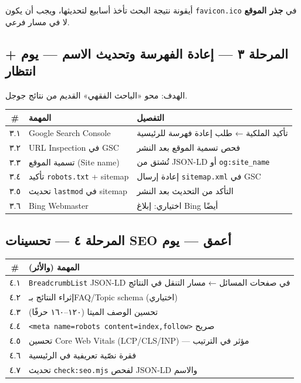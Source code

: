 \documentclass[11pt]{article}
\newcommand{\code}[1]{\textcolor{darkbg}{\texttt{\small #1}}}
\begin{document}
\begin{riskbox}
أيقونة نتيجة البحث تأخذ أسابيع لتحديثها، ويجب أن يكون \code{favicon.ico} في \textbf{جذر الموقع} لا في مسار فرعي.
\end{riskbox}

\subsection{المرحلة ٣ — إعادة الفهرسة وتحديث الاسم — يوم + انتظار}
الهدف: محو «الباحث الفقهي» القديم من نتائج جوجل.

\begin{tabular}{@{}c p{6.5cm} p{5cm}@{}}
\toprule
\textbf{\#} & \textbf{المهمة} & \textbf{التفصيل} \\
\midrule
٣.١ & Google Search Console & تأكيد الملكية ← طلب إعادة فهرسة للرئيسية \\
٣.٢ & URL Inspection في GSC & فحص تسمية الموقع بعد النشر \\
٣.٣ & تسمية الموقع (Site name) & تُشتق من JSON-LD أو \code{og:site\_name} \\
٣.٤ & تأكيد \code{robots.txt} + sitemap & إعادة إرسال \code{sitemap.xml} في GSC \\
٣.٥ & تحديث \code{lastmod} في sitemap & التأكد من التحديث بعد النشر \\
٣.٦ & Bing Webmaster & اختياري: إبلاغ Bing أيضًا \\
\bottomrule
\end{tabular}

\subsection{المرحلة ٤ — تحسينات SEO أعمق — يوم}
\begin{tabular}{@{}c p{9.5cm}@{}}
\toprule
\textbf{\#} & \textbf{المهمة (والأثر)} \\
\midrule
٤.١ & \code{BreadcrumbList} JSON-LD في صفحات المسائل ← مسار التنقل في النتائج \\
٤.٢ & إثراء النتائج بـFAQ/Topic schema (اختياري) \\
٤.٣ & تحسين الوصف الميتا (١٢٠–١٦٠ حرفًا) \\
٤.٤ & \code{<meta name=robots content=index,follow>} صريح \\
٤.٥ & تحسين Core Web Vitals (LCP/CLS/INP) — مؤثر في الترتيب \\
٤.٦ & فقرة نصّية تعريفية في الرئيسية \\
٤.٧ & تحديث \code{check:seo.mjs} لفحص JSON-LD والاسم \\
\bottomrule
\end{tabular}
\end{document}
